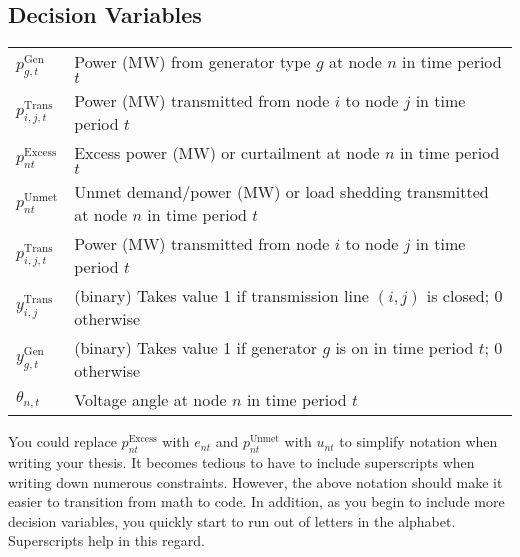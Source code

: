 \documentclass[10pt]{article}
\newcommand{\mc}{\mathcal}
\begin{document}
\subsection{Decision Variables}

\begin{tabular}{ll}
$p_{g,t}^{\text{{Gen}}}$ & Power (MW) from generator type $g$ at node $n$ in time period $t$ \\
$p_{i,j,t}^{\text{{Trans}}}$ & Power (MW) transmitted from node $i$ to node $j$ in time period $t$ \\
$p_{nt}^{\text{{Excess}}}$ & Excess power (MW) or curtailment at node $n$ in time period $t$ \\
$p_{nt}^{\text{{Unmet}}}$  & Unmet demand/power (MW) or load shedding transmitted at node $n$ in time period $t$ \\
$p_{i,j,t}^{\text{{Trans}}}$ & Power (MW) transmitted from node $i$ to node $j$ in time period $t$ \\
$y_{i,j}^{\text{{Trans}}}$ & (binary) Takes value 1 if transmission line $(i,j)$ is closed; 0 otherwise \\
$y_{g,t}^{\text{{Gen}}}$   & (binary) Takes value 1 if generator $g$ is on in time period $t$; 0 otherwise \\
$\theta_{n,t}$ & Voltage angle at node $n$ in time period $t$ \\
\end{tabular}

You could replace $p_{nt}^{\text{{Excess}}}$ with $e_{nt}$ and $p_{nt}^{\text{{Unmet}}}$ with $u_{nt}$ to simplify notation when writing your thesis. It becomes tedious to have to include superscripts when writing down numerous constraints.  However, the above notation should make it easier to transition from math to code.  In addition, as you begin to include more decision variables, you quickly start to run out of letters in the alphabet.  Superscripts help in this regard.


%
%
%
%
\end{document}
